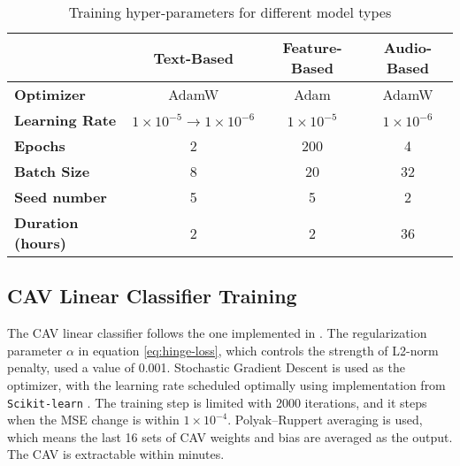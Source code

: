 \begin{table}[H]
  \centering
  \begin{tabular}{|l|c|c|c|}
    \hline
                              & \textbf{Text-Based}                             & \textbf{Feature-Based} & \textbf{Audio-Based} \\
    \hline
    \textbf{Optimizer}        & AdamW                                           & Adam                   & AdamW                \\ \hline
    \textbf{Learning Rate}    & $1 \times 10^{-5} \rightarrow 1 \times 10^{-6}$ & $1 \times 10^{-5}$     & $1 \times 10^{-6}$   \\ \hline
    \textbf{Epochs}           & 2                                               & 200                    & 4                    \\ \hline
    \textbf{Batch Size}       & 8                                               & 20                     & 32                   \\ \hline
    \textbf{Seed number}      & 5                                               & 5                      & 2                    \\ \hline
    \textbf{Duration (hours)} & 2                                               & 2                      & 36                   \\ \hline
  \end{tabular}
  \caption{Training hyper-parameters for different model types}
  \label{tab:training_hyper_param}
\end{table}

\subsection{CAV Linear Classifier Training}
The CAV linear classifier follows the one implemented in \cite{feature_bias}. The regularization parameter $\alpha$ in equation \ref{eq:hinge-loss}, which controls the strength of L2-norm penalty, used a value of 0.001. Stochastic Gradient Descent is used as the optimizer, with the learning rate scheduled optimally using implementation from \verb|Scikit-learn| \cite{scikit-learn}. The training step is limited with 2000 iterations, and it steps when the MSE change is within $1 \times 10^{-4}$. Polyak–Ruppert averaging is used, which means the last 16 sets of CAV weights and bias are averaged as the output. The CAV is extractable within minutes.

